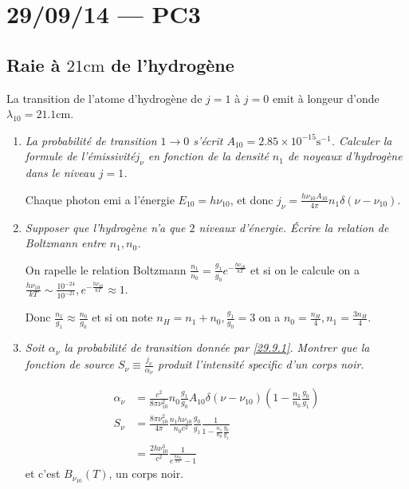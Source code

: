 \documentclass[10pt]{report}
\newcommand{\scinot}[2]{#1\times 10^{#2}}
\begin{document}
\chapter{29/09/14 --- PC3}

\section{Raie \`a $21\mathrm{cm}$ de l'hydrog\`ene}

La transition de l'atome d'hydrog\`ene de $j=1$ \`a $j=0$ emit \`a longeur d'onde $\lambda_{10} = 21.1\mathrm{cm}$.

\begin{enumerate}[1.]
    \item \emph{La probabilit\'e de transition $1 \to 0$ s'\'ecrit $A_{10} = \scinot{2.85}{-15}\mathrm{s^{-1}}$. Calculer la formule de l'\'emissivit\'e$j_\nu$ en fonction de la densit\'e $n_1$ de noyeaux d'hydrog\`ene dans le niveau $j=1$.}

        Chaque photon emi a l'\'energie $E_{10} = h\nu_{10}$, et donc $j_\nu = \frac{h\nu_{10}A_{10}}{4\pi}n_1\delta(\nu - \nu_{10})$. 

    \item \emph{Supposer que l'hydrog\`ene n'a que $2$ niveaux d'\'energie. \'Ecrire la relation de Boltzmann entre $n_1, n_0$.}

        On rapelle le relation Boltzmann $\frac{n_1}{n_0} = \frac{g_1}{g_0}e^{-\frac{h\nu_{10}}{kT}}$ et si on le calcule on a $\frac{h\nu_{10}}{kT} \sim\frac{10^{-24}}{10^{-21}}, e^{-\frac{h\nu_{10}}{kT}} \approx 1$.

        Donc $\frac{n_1}{g_1} \approx \frac{n_0}{g_0}$ et si on note $n_{H} = n_{1}+ n_0, \frac{g_1}{g_0} = 3$ on a $n_0 = \frac{n_H}{4}, n_1 = \frac{3n_H}{4}$.

    \item \emph{Soit $\alpha_\nu$ la probabilit\'e de transition donn\'ee par \eqref{29.9.1}. Montrer que la fonction de source $S_\nu \equiv \frac{j_\nu}{\alpha_\nu}$ produit l'intensit\'e specific d'un corps noir.}

        \begin{align}
            \alpha_\nu &= \frac{c^2}{8\pi \nu_{10}^2}n_0 \frac{g_1}{g_0}A_{10}\delta\left( \nu - \nu_{10} \right)\left( 1 - \frac{n_1}{n_0}\frac{g_0}{g_1} \right)\label{29.9.1}\\
            S_\nu &= \frac{8\pi \nu_{10}^2}{4\pi}\frac{n_1h\nu_{10}}{n_0c^2}\frac{g_0}{g_1}\frac{1}{1 - \frac{n_1}{n_0}\frac{g_0}{g_1}}\\
            &= \frac{2h\nu_{10}^3}{c^2}\frac{1}{e^{\frac{h\nu_{10}}{kT}} - 1}
        \end{align}
        et c'est $B_{\nu_{10}}(T)$, un corps noir.


\end{enumerate}
\end{document}
